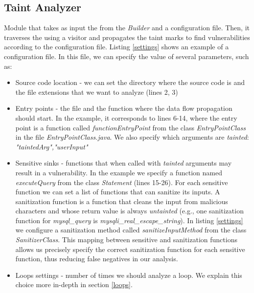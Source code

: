 \subsection{Taint Analyzer} 
Module that takes as input the \astname{} from the \textit{\astname{} Builder} and a configuration file. Then, it traverses the \astname{} using a visitor and propagates the taint marks to find vulnerabilities according to the configuration file. 
Listing \ref{settings} shows an example of a configuration file. In this file, we can specify the value of several parameters, such as:
\begin{itemize}
    \item Source code location - we can set the directory where the source code is and the file extensions that we want to analyze (lines 2, 3)
    \item Entry points - the file and the function where the data flow propagation should start. In the example, it corresponds to lines 6-14, where the entry point is a function called \textit{functionEntryPoint} from the class \textit{EntryPointClass} in the file \textit{EntryPointClass.java}. We also specify which arguments are \textit{tainted}: \textit{"taintedArg","userInput"}
    \item Sensitive sinks - functions that when called with \textit{tainted} arguments may result in a vulnerability. In the example we specify a function named \textit{executeQuery} from the class \textit{Statement} (lines 15-26). For each sensitive function we can set a list of functions that can sanitize its inputs. A sanitization function is a function that cleans the input from malicious characters and whose return value is always \textit{untainted} (e.g., one sanitization function for \textit{mysql\_query} is \textit{mysqli\_real\_escape\_string}). In listing \ref{settings} we configure a sanitization method called \textit{sanitizeInputMethod} from the class \textit{SanitizerClass}. This mapping between sensitive and sanitization functions allows us precisely specify the correct sanitization function for each sensitive function, thus reducing false negatives in our analysis.
    
    \item Loops settings - number of times we should analyze a loop. We explain this choice more in-depth in section \ref{loops}.
\end{itemize}


